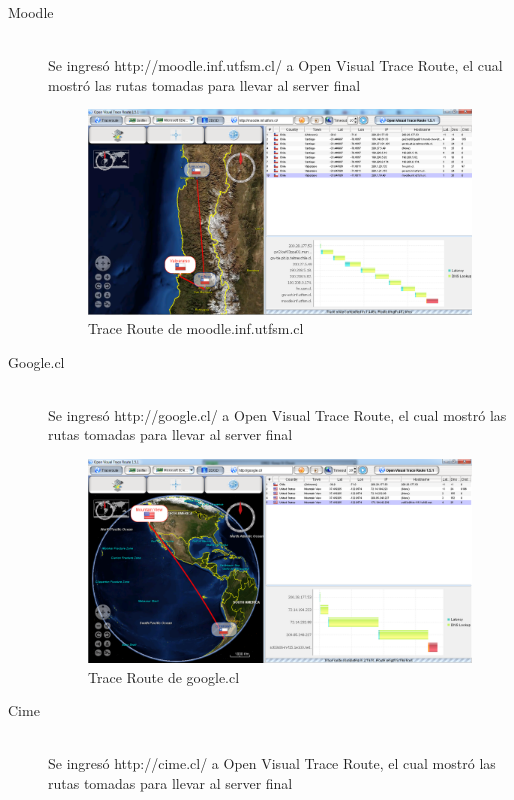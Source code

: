 \documentclass{article}
\begin{document}
\begin{description}

  \item[Moodle] \hfill \\
Se ingresó http://moodle.inf.utfsm.cl/ a Open Visual Trace Route, el cual mostró las rutas tomadas para llevar al server final

\begin{figure}[h!]
\centering
\includegraphics[scale=0.30]{tracerouteMoodle.png}
\caption{Trace Route de moodle.inf.utfsm.cl}
\label{fig:moodle}
\end{figure}  


\item[Google.cl] \hfill \\
Se ingresó http://google.cl/ a Open Visual Trace Route, el cual mostró las rutas tomadas para llevar al server final

\begin{figure}[h!]
\centering
\includegraphics[scale=0.30]{tracerouteGoogleCL.png}
\caption{Trace Route de google.cl}
\label{fig:google}
\end{figure}    
  
  
\item[Cime] \hfill \\
Se ingresó http://cime.cl/ a Open Visual Trace Route, el cual mostró las rutas tomadas para llevar al server final


\end{description}
\end{document}
